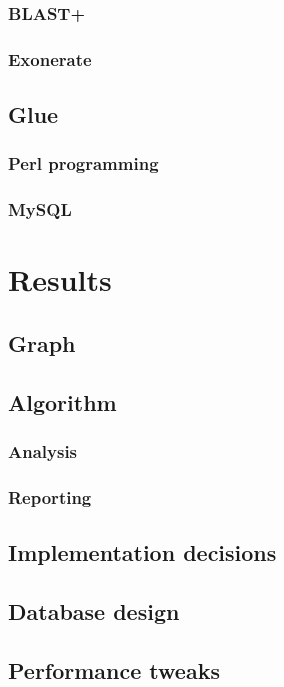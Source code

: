 \documentclass[a4paper,12.5pt]{scrreprt}
\begin{document}
		\subsection{BLAST+}
			
		\subsection{Exonerate}
			
	\section{Glue}
		\subsection{Perl programming}
			
		\subsection{MySQL}
			

\chapter{Results}
	\section{Graph}
		
	\section{Algorithm}
		\subsection{Analysis}
			
		\subsection{Reporting}
			
	\section{Implementation decisions}
		
	\section{Database design}
		
	\section{Performance tweaks}
\end{document}
